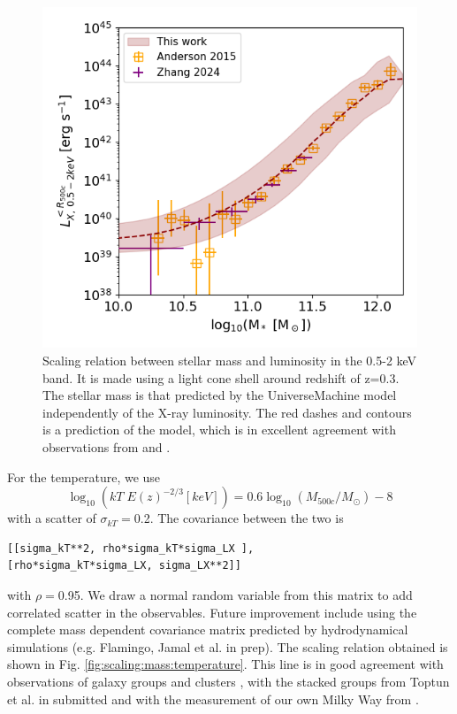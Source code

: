 \documentclass[twocolumn,iop]{openjournal}
\begin{document}
\begin{figure}
    \centering
    \includegraphics[width=0.95\linewidth]{figures_GAS/Ms_LX.png}
    \caption{Scaling relation between stellar mass and luminosity in the 0.5-2 keV band. It is made using a light cone shell around redshift of z=0.3. The stellar mass is that predicted by the UniverseMachine model independently of the X-ray luminosity. The red dashes and contours is a prediction of the model, which is in excellent agreement with observations from \citet[][in orange]{AndersonGaspariWhite_2015MNRAS.449.3806A} and \citet[][in purple]{ZhangComparatPonti_2024A&A...690A.268Z}.
}
    \label{fig:MsLX}
\end{figure}

For the temperature, we use 
\begin{equation}
\log_{10}(kT\;  E(z)^{-2/3} [keV]) = 0.6 \log_{10}(M_{500c}/M_\odot) - 8
\end{equation}
with a scatter of $\sigma_{kT}=$0.2.
The covariance between the two is  
\begin{verbatim}
[[sigma_kT**2, rho*sigma_kT*sigma_LX ],
[rho*sigma_kT*sigma_LX, sigma_LX**2]]
\end{verbatim}
with $\rho=$0.95. 
We draw a normal random variable from this matrix to add correlated scatter in the observables. 
Future improvement include using the complete mass dependent covariance matrix predicted by hydrodynamical simulations (e.g. Flamingo, Jamal et al. in prep). 
The scaling relation obtained is shown in Fig. \ref{fig:scaling:mass:temperature}.
This line is in good agreement with observations of galaxy groups and clusters \citep{LovisariReiprichSchellenberger_2015A&A...573A.118L, MantzAllenMorris_2016MNRAS.456.4020M, AdamiGilesKoulouridis_2018A&A...620A...5A,BulbulChiuMohr_2019ApJ...871...50B,LovisariSchellenbergerSereno_2020ApJ...892..102L}, with the stacked groups from Toptun et al. in submitted and with the measurement of our own Milky Way from \citep{PontiZhengLocatelli_2023A&A...674A.195P}.
\end{document}
